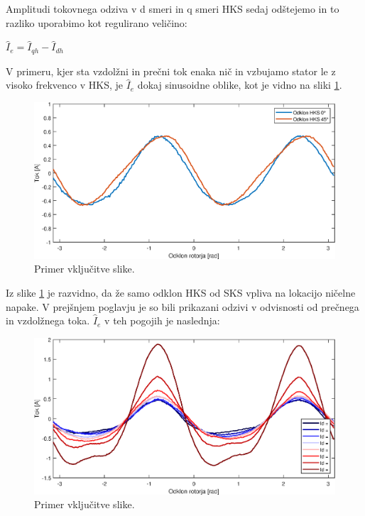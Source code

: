 \documentclass[a4paper,twoside,openright,12pt,slovene]{book}
\begin{document}
Amplitudi tokovnega odziva v d smeri in q smeri HKS sedaj odštejemo in to razliko uporabimo kot regulirano veličino:

\begin{center}
    $\hat{I}_{e} = \hat{I}_{qh} - \hat{I}_{dh}$
\end{center}

V primeru, kjer sta vzdolžni in prečni tok enaka nič in vzbujamo stator le z visoko frekvenco v HKS, je $\hat{I}_{e}$ dokaj sinusoidne oblike, kot je vidno na sliki \ref{reguliranaVelicinaIdq0}.

\begin{figure}[!htbp]
    \centering
    \includegraphics[width=1\columnwidth]{Slike/reguliranaVelicinaIdq0.eps}
    \caption{\label{reguliranaVelicinaIdq0} Primer vključitve slike.}
\end{figure}

Iz slike \ref{reguliranaVelicinaIdq0} je razvidno, da že samo odklon HKS od SKS vpliva na lokacijo ničelne napake. V prejšnjem poglavju je so bili prikazani odzivi v odvisnosti od prečnega in
vzdolžnega toka. $\hat{I}_{e}$ v teh pogojih je naslednja:

\begin{figure}[!htbp]
    \centering
    \includegraphics[width=1\columnwidth]{Slike/reguliranaVelicinaId.eps}
    \caption{\label{reguliranaVelicinaId} Primer vključitve slike.}
\end{figure}
\end{document}
